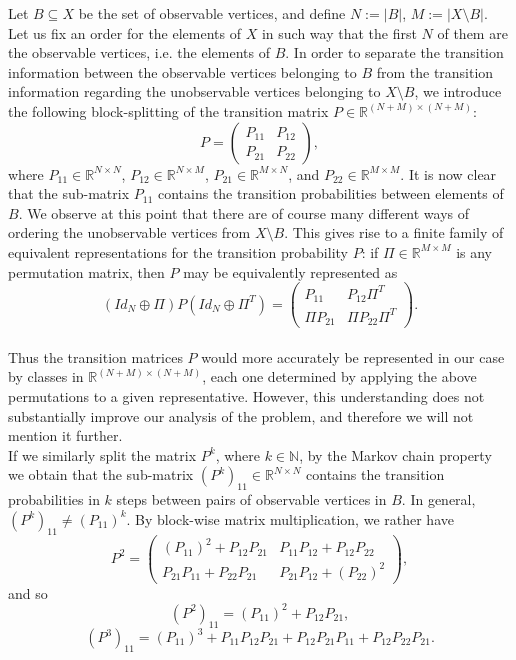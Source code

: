 \documentclass[a4paper,11pt,oneside]{amsart}
\newcommand{\R}{{\mathbb R}}
\newcommand{\N}{{\mathbb N}}
\begin{document}
Let $B\subseteq X$ be the set of observable vertices, and define $N:=|B|$, $M:=|X\setminus B|$. Let us fix an order for the elements of $X$ in such way that the first $N$ of them are the observable vertices, i.e. the elements of $B$. In order to separate the transition information between the observable vertices belonging to $B$ from the transition information regarding the unobservable vertices belonging to $X\setminus B$, we introduce the following block-splitting of the transition matrix $P\in \R^{(N+M)\times (N+M)}$:
\begin{equation}\label{eq:P-splitting} P=\left(\begin{array}{cc}
    P_{11} & P_{12} \\
    P_{21} & P_{22}
\end{array}\right), \end{equation}
where $P_{11} \in \R^{N\times N}$, $P_{12}\in \R^{N\times M}$, $P_{21}\in \R^{M\times N}$, and $P_{22}\in\R^{M\times M}$. It is now clear that the sub-matrix $P_{11}$ contains the transition probabilities between elements of $B$. We observe at this point that there are of course many different ways of ordering the unobservable vertices from $X\setminus B$. This gives rise to a finite family of equivalent representations for the transition probability $P$: if $\Pi\in \R^{M\times M}$ is any permutation matrix, then $P$ may be equivalently represented as
$$ (Id_N\oplus \Pi)P(Id_N\oplus \Pi^T) =\left(\begin{array}{cc}
    P_{11} & P_{12}\Pi^T \\
    \Pi P_{21} & \Pi P_{22} \Pi^T
\end{array}\right). $$\\
Thus the transition matrices $P$ would more accurately be represented in our case by classes in $\R^{(N+M)\times (N+M)}$, each one determined by applying the above permutations to a given representative. However, this understanding does not substantially improve our analysis of the problem, and therefore we will not mention it further.\\ 


If we similarly split the matrix $P^k$, where $k\in\N$, by the Markov chain property we obtain that the sub-matrix $(P^k)_{11}\in \R^{N\times N}$ contains the transition probabilities in $k$ steps between pairs of observable vertices in $B$. In general, $(P^k)_{11} \neq (P_{11})^k$.  By block-wise matrix multiplication, we rather have 
   $$ P^2 = \left(\begin{array}{cc}
    (P_{11})^2 + P_{12}P_{21} & P_{11}P_{12} + P_{12}P_{22} \\
    P_{21}P_{11}+P_{22}P_{21} & P_{21}P_{12} + (P_{22})^2 
\end{array}\right), $$
and so
\begin{equation}\label{eq:formula-P2}
    (P^2)_{11} =  (P_{11})^2 + P_{12}P_{21},
\end{equation}
\begin{equation}\label{eq:formula-P3}
(P^3)_{11} = (P_{11})^3 + P_{11}P_{12}P_{21} + P_{12}P_{21}P_{11}+P_{12}P_{22}P_{21}. 
\end{equation}
\end{document}
